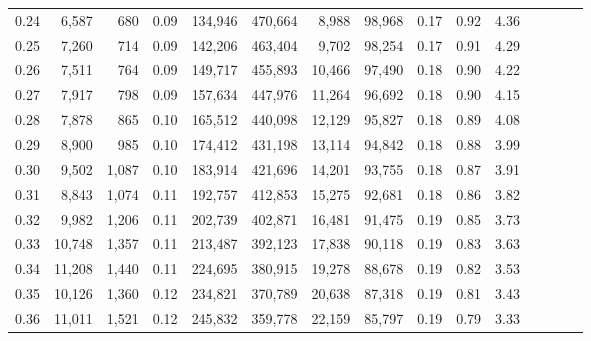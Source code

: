 \begin{tabular}{rrrcrrrrrrrrrrr}
0.24 &   6,587 &    680 &                                       0.09 &  134,946 &  470,664 &    8,988 &   98,968 &  0.17 &  0.92 &                         4.36 \\
0.25 &   7,260 &    714 &                                       0.09 &  142,206 &  463,404 &    9,702 &   98,254 &  0.17 &  0.91 &                         4.29 \\
0.26 &   7,511 &    764 &                                       0.09 &  149,717 &  455,893 &   10,466 &   97,490 &  0.18 &  0.90 &                         4.22 \\
0.27 &   7,917 &    798 &                                       0.09 &  157,634 &  447,976 &   11,264 &   96,692 &  0.18 &  0.90 &                         4.15 \\
0.28 &   7,878 &    865 &                                       0.10 &  165,512 &  440,098 &   12,129 &   95,827 &  0.18 &  0.89 &                         4.08 \\
0.29 &   8,900 &    985 &                                       0.10 &  174,412 &  431,198 &   13,114 &   94,842 &  0.18 &  0.88 &                         3.99 \\
0.30 &   9,502 &  1,087 &                                       0.10 &  183,914 &  421,696 &   14,201 &   93,755 &  0.18 &  0.87 &                         3.91 \\
0.31 &   8,843 &  1,074 &                                       0.11 &  192,757 &  412,853 &   15,275 &   92,681 &  0.18 &  0.86 &                         3.82 \\
0.32 &   9,982 &  1,206 &                                       0.11 &  202,739 &  402,871 &   16,481 &   91,475 &  0.19 &  0.85 &                         3.73 \\
0.33 &  10,748 &  1,357 &                                       0.11 &  213,487 &  392,123 &   17,838 &   90,118 &  0.19 &  0.83 &                         3.63 \\
0.34 &  11,208 &  1,440 &                                       0.11 &  224,695 &  380,915 &   19,278 &   88,678 &  0.19 &  0.82 &                         3.53 \\
0.35 &  10,126 &  1,360 &                                       0.12 &  234,821 &  370,789 &   20,638 &   87,318 &  0.19 &  0.81 &                         3.43 \\
0.36 &  11,011 &  1,521 &                                       0.12 &  245,832 &  359,778 &   22,159 &   85,797 &  0.19 &  0.79 &                         3.33 \\

\end{tabular}

